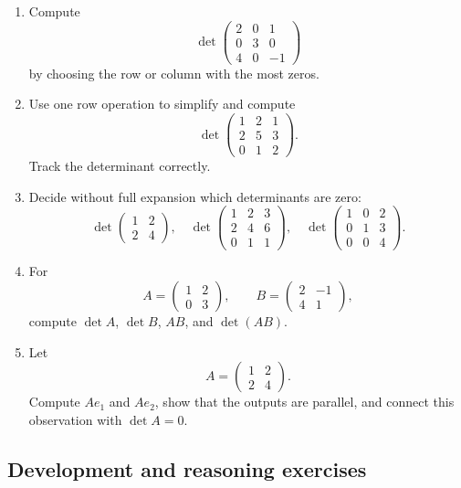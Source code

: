 \begin{enumerate}
\item Compute
\[
\det\begin{pmatrix}2&0&1\\0&3&0\\4&0&-1\end{pmatrix}
\]
by choosing the row or column with the most zeros.

\item Use one row operation to simplify and compute
\[
\det\begin{pmatrix}1&2&1\\2&5&3\\0&1&2\end{pmatrix}.
\]
Track the determinant correctly.

\item Decide without full expansion which determinants are zero:
\[
\det\begin{pmatrix}1&2\\2&4\end{pmatrix},
\quad
\det\begin{pmatrix}1&2&3\\2&4&6\\0&1&1\end{pmatrix},
\quad
\det\begin{pmatrix}1&0&2\\0&1&3\\0&0&4\end{pmatrix}.
\]

\item For
\[
A=\begin{pmatrix}1&2\\0&3\end{pmatrix},
\qquad
B=\begin{pmatrix}2&-1\\4&1\end{pmatrix},
\]
compute $\det A$, $\det B$, $AB$, and $\det(AB)$.

\item Let
\[
A=\begin{pmatrix}1&2\\2&4\end{pmatrix}.
\]
Compute $Ae_1$ and $Ae_2$, show that the outputs are parallel, and connect this observation with $\det A=0$.
\end{enumerate}

\subsection{Development and reasoning exercises}

